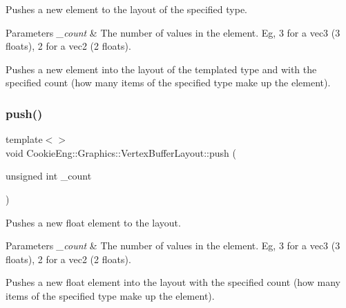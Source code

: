 Pushes a new element to the layout of the specified type. 


\begin{DoxyParams}{Parameters}
{\em \+\_\+count} & The number of values in the element. Eg, 3 for a vec3 (3 floats), 2 for a vec2 (2 floats).\\
\hline
\end{DoxyParams}
Pushes a new element into the layout of the templated type and with the specified count (how many items of the specified type make up the element). \mbox{\label{class_cookie_eng_1_1_graphics_1_1_vertex_buffer_layout_a3f1a639714762ec45edf48a68995d7bd}} 
\subsubsection{\texorpdfstring{push()}{push()}\hspace{0.1cm}{\footnotesize\ttfamily [2/4]}}
{\footnotesize\ttfamily template$<$$>$ \\
void Cookie\+Eng\+::\+Graphics\+::\+Vertex\+Buffer\+Layout\+::push (\begin{DoxyParamCaption}\item[{unsigned int}]{\+\_\+count }\end{DoxyParamCaption})\hspace{0.3cm}{\ttfamily [inline]}}



Pushes a new float element to the layout. 


\begin{DoxyParams}{Parameters}
{\em \+\_\+count} & The number of values in the element. Eg, 3 for a vec3 (3 floats), 2 for a vec2 (2 floats).\\
\hline
\end{DoxyParams}
Pushes a new float element into the layout with the specified count (how many items of the specified type make up the element). \mbox{\label{class_cookie_eng_1_1_graphics_1_1_vertex_buffer_layout_a3f1a639714762ec45edf48a68995d7bd}} 
